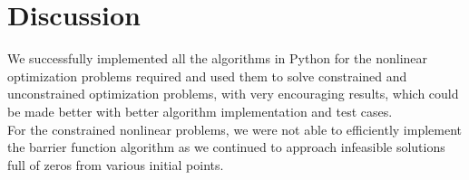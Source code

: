\clearpage
\section{Discussion}
We successfully implemented all the algorithms in Python for the nonlinear optimization problems required and used them to solve constrained and unconstrained optimization problems, with very encouraging results, which could be made better with better algorithm implementation and test cases. \\
For the constrained nonlinear problems, we were not able to efficiently implement the barrier function algorithm as we continued to approach infeasible solutions full of zeros from various initial points.